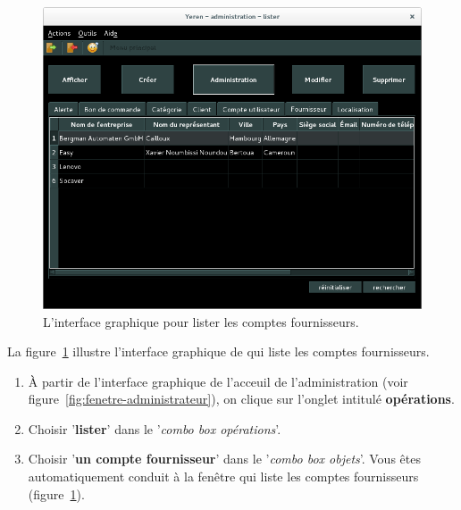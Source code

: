 \begin{figure}[!htpb]
	\centering
	\includegraphics[scale=0.45]{images/compte-fournisseur-lister.png}
	\caption{L'interface graphique pour lister les comptes fournisseurs.}
	\label{fig:admin-comptes-fournisseurs-lister}
\end{figure}

La figure~\ref{fig:admin-comptes-fournisseurs-lister} illustre
l'interface graphique de \yeroth qui liste les comptes fournisseurs.

\begin{enumerate}[1)]
	\item \`A partir de l'interface graphique de l'acceuil de
		l'administration (voir figure~\ref{fig:fenetre-administrateur}),
		on clique sur l'onglet intitul\'e \textbf{op\'erations}. 
		
	\item Choisir '\textbf{lister}' dans le '\emph{combo box
		op\'erations}'.
		
	\item Choisir '\textbf{un compte fournisseur}' dans
		le '\emph{combo box objets}'. Vous \^etes automatiquement
		conduit \`a la fen\^etre qui liste les comptes fournisseurs
		(figure~\ref{fig:admin-comptes-fournisseurs-lister}).
\end{enumerate}


\newpage
{}

